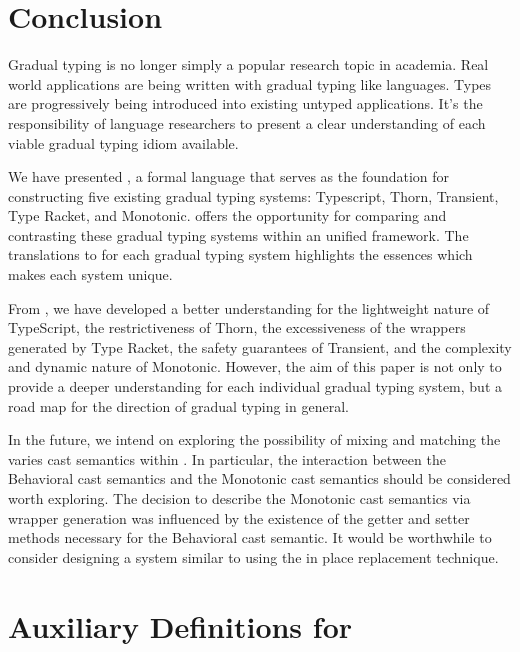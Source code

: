 \documentclass[a4paper,USenglish]{tex/lipics-v2016}
\begin{document}
\section{Conclusion}

Gradual typing is no longer simply a popular research topic in academia.
Real world applications are being written with gradual typing like languages.
Types are progressively being introduced into existing untyped applications.
It's the responsibility of language researchers to present a clear understanding 
of each viable gradual typing idiom available.

We have presented \kafka, a formal language that serves as the foundation for 
constructing five existing gradual typing systems: Typescript, Thorn, Transient, 
Type Racket, and Monotonic. \kafka offers the opportunity for comparing and 
contrasting these gradual typing systems within an unified framework. The translations
to \kafka for each gradual typing system highlights the essences which makes each system unique.

From \kafka, we have developed a better understanding for the lightweight nature of TypeScript,
the restrictiveness of Thorn, the excessiveness of the wrappers generated by Type Racket,
the safety guarantees of Transient, and the complexity and dynamic nature of Monotonic.
However, the aim of this paper is not only to provide a deeper understanding for each
individual gradual typing system, but a road map for the direction of gradual typing in general.

In the future, we intend on exploring the possibility of mixing and matching the varies 
cast semantics within \kafka. In particular, the interaction between the Behavioral cast semantics 
and the Monotonic cast semantics should be considered worth exploring.
The decision to describe the Monotonic cast semantics via wrapper generation was influenced
by the existence of the getter and setter methods necessary for the Behavioral cast semantic.
It would be worthwhile to consider designing a system similar to \kafka using the in place 
replacement technique. 


\clearpage




\appendix
\section{Auxiliary Definitions for \kafka}%
\end{document}
